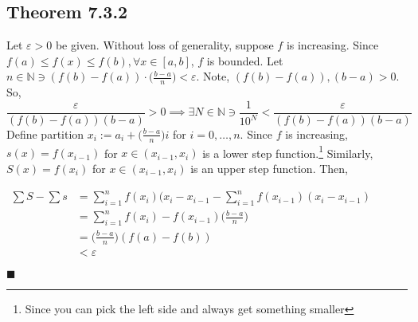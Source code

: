 \documentclass[11pt]{book}
\newcommand{\N}{\mathbb{N}}
\newcommand{\QED}{\begin{flushright}$\blacksquare$\end{flushright}}
\begin{document}
		\subsection{Theorem 7.3.2}
		\label{subsec:theor732}
			\begin{theor}
				Let $\varepsilon > 0$ be given. Without loss of generality, suppose $f$ is increasing. Since $f(a) \leq f(x) \leq f(b), \forall x  \in [a,b]$, $f$ is bounded. 
				Let $n \in \N \ni (f(b) - f(a)) \cdot \big(\frac{b-a}{n}\big) < \varepsilon$. Note, $(f(b) - f(a)), (b-a) > 0$. So, 
				$$\frac{\varepsilon}{(f(b) - f(a))(b-a)} > 0 \implies \exists N \in \N \ni \frac{1}{10^N} <  \frac{\varepsilon}{(f(b) - f(a))(b-a)}$$
				Define partition $x_i := a_i + \big(\frac{b-a}{n}\big)i$ for $i = 0,\dots,n$. Since $f$ is increasing, $s(x) = f(x_{i-1})$ for $x \in (x_{i-1},x_i)$ is a lower step
				function.\footnote{Since you can pick the left side and always get something smaller} Similarly, $S(x) = f(x_i)$ for $x \in (x_{i-1}, x_i)$ is an upper step function.
				Then, 
					\begin{center}
						\begin{math}
							\begin{aligned}
								\sum{S} - \sum{s} & = \sum_{i = 1}^n{f(x_i)(x_i - x_{i-1}} - \sum_{i = 1}^n{f(x_{i-1})(x_i-x_{i-1})}\\
								& = \sum_{i=1}^n{f(x_i) - f(x_{i-1})\big(\frac{b-a}{n}\big)}\\
								& = \bigg(\frac{b-a}{n}\bigg)(f(a) - f(b))\\
								& < \varepsilon
							\end{aligned}
						\end{math}
					\end{center}
				\QED

			\end{theor}
\end{document}
